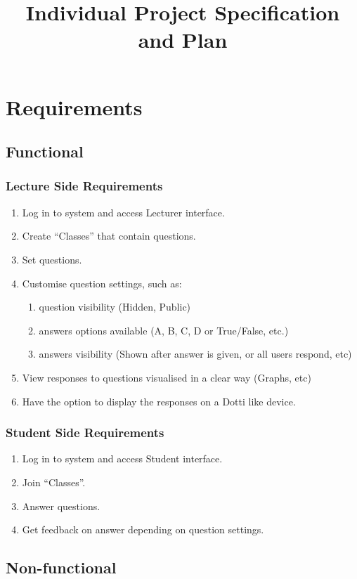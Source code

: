 \documentclass{article}
\title{
\textmd{\textbf{Individual Project Specification and Plan}}\\
}
\author{\textbf{\hmwkAuthorName}}
\begin{document}
\section{Requirements}
\subsection{Functional}
\subsubsection{Lecture Side Requirements}
\begin{enumerate}
	\item Log in to system and access Lecturer interface.
	\item Create ``Classes'' that contain questions.
	\item Set questions.
	\item Customise question settings, such as: 
	\begin{enumerate}
		\item question visibility (Hidden, Public)
		\item answers options available (A, B, C, D or True/False, etc.)
		\item answers visibility (Shown after answer is given, or all users respond, etc)
	\end{enumerate}
	\item View responses to questions visualised in a clear way (Graphs, etc)
	\item Have the option to display the responses on a Dotti like device.
\end{enumerate}
\subsubsection{Student Side Requirements}
\begin{enumerate}
	\item Log in to system and access Student interface.
	\item Join ``Classes''.
	\item Answer questions.
	\item Get feedback on answer depending on question settings.
\end{enumerate}
\subsection{Non-functional}
\end{document}
